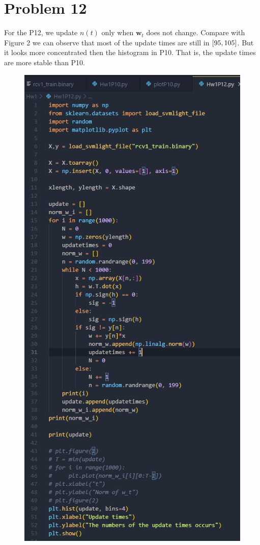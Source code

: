 \documentclass[12pt,a4paper]{article}
\begin{document}
\section*{Problem 12}    
For the P12, we update $n(t)$ only when $\bm{w}_{t}$ does not change. 
Compare with Figure 2 we can observe that most of the update times are still in $\interval{95}{105}$.
But it looks more concentrated then the histogram in P10. That is, the update times are more stable than P10.   
\begin{figure}[hbp]
    \centering
    \begin{minipage}{0.48\linewidth}
        \centering
        \includegraphics[width = \linewidth]{Hw1P12 snapshot.png}

\end{minipage}
\end{figure}
\end{document}
